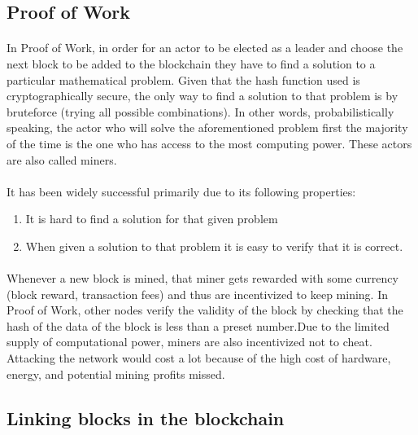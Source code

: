 \subsection{Proof of Work}

\paragraph{}In Proof of Work, in order for an actor to be elected as a leader and choose the next block to be added to the blockchain they have to find a solution to a particular mathematical problem.
Given that the hash function used is cryptographically secure, the only way to find a solution to that problem is by bruteforce (trying all possible combinations). In other words, probabilistically speaking, the actor who will solve the aforementioned problem first the majority of the time is the one who has access to the most computing power. These actors are also called miners.
\paragraph{}It has been widely successful primarily due to its following properties:

\begin{enumerate}
  \item It is hard to find a solution for that given problem
  \item When given a solution to that problem it is easy to verify that it is correct.
\end{enumerate}

\paragraph{} Whenever a new block is mined, that miner gets rewarded with some currency (block reward, transaction fees) and thus are incentivized to keep mining. In Proof of Work, other nodes verify the validity of the block by checking that the hash of the data of the block is less than a preset number.Due to the limited supply of computational power, miners are also incentivized not to cheat. Attacking the network would cost a lot because of the high cost of hardware, energy, and potential mining profits missed.

\subsection{Linking blocks in the blockchain}

